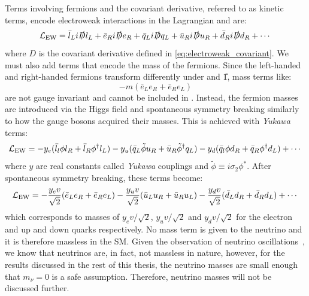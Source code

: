 Terms involving fermions and the covariant derivative, referred to as kinetic terms, encode electroweak interactions in the Lagrangian and are:
\begin{equation}
  \mathcal{L}_\mathrm{EW} = \bar{l}_L i \slashed{D} l_L + \bar{e}_R i \slashed{D} e_R + \bar{q}_L i \slashed{D} q_L + \bar{u}_R i \slashed{D} u_R + \bar{d}_R i \slashed{D} d_R + \cdots
\end{equation}
where $D$ is the covariant derivative defined in \cref{eq:electroweak_covariant}. We must also add terms that encode the mass of the fermions. Since the left-handed and right-handed fermions transform differently under  and \U{1}, mass terms like:
\begin{equation}
  -m(\bar{e}_L e_R + \bar{e}_R e_L)
\end{equation} 
are not gauge invariant and cannot be included in \LSM. Instead, the fermion masses are introduced via the Higgs field and spontaneous symmetry breaking similarly to how the gauge bosons acquired their masses. This is achieved with \textit{Yukawa} terms:
\begin{equation}
  \mathcal{L}_\mathrm{EW} = - y_e (\bar{l}_l \phi l_R + \bar{l}_R \phi^\dag l_L) -  y_u (\bar{q}_L \tilde{\phi} u_R + \bar{u}_R \tilde{\phi}^\dag q_L) - y_d (\bar{q}_l \phi d_R + \bar{q}_R \phi^\dag d_L) + \cdots
\end{equation}
where $y$ are real constants called \textit{Yukawa} couplings and $\tilde{\phi} \equiv i \sigma_2 \phi^*$. After spontaneous symmetry breaking, these terms become:
\begin{equation}
  \mathcal{L}_\mathrm{EW} = -\frac{y_e v}{\sqrt{2}}  (\bar{e}_L e_R + \bar{e}_R e_L) -\frac{y_u v}{\sqrt{2}}  (\bar{u}_L u_R + \bar{u}_R u_L) -\frac{y_d v}{\sqrt{2}}  (\bar{d}_L d_R + \bar{d}_R d_L) + \cdots
\end{equation}
which corresponds to masses of $y_e v / \sqrt{2}$, $y_u v / \sqrt{2}$ and $y_d v / \sqrt{2}$ for the electron and up and down quarks respectively. No mass term is given to the neutrino and it is therefore massless in the SM. Given the observation of neutrino oscillations~\cite{Super-Kamiokande:1998kpq}, we know that neutrinos are, in fact, not massless in nature, however, for the results discussed in the rest of this thesis, the neutrino masses are small enough that $m_\nu = 0$ is a safe assumption. Therefore, neutrino masses will not be discussed further.

